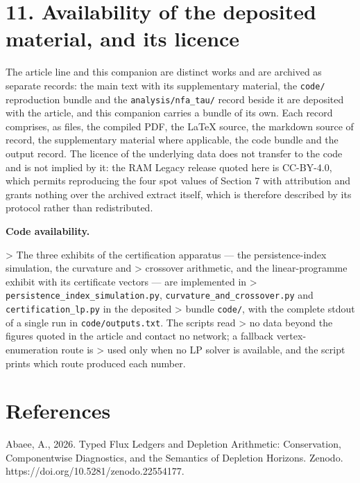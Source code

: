 \documentclass[11pt]{article}
\begin{document}
\vspace{0.8em}

\section*{11. Availability of the deposited material, and its licence}\label{11-availability-of-the-deposited-material-and-its-licence}

The article line and this companion are distinct works and are archived as separate records: the main text with its supplementary material, the \texttt{code/} reproduction bundle and the \texttt{analysis/nfa\_tau/} record beside it are deposited with the article, and this companion carries a bundle of its own. Each record comprises, as files, the compiled PDF, the LaTeX source, the markdown source of record, the supplementary material where applicable, the code bundle and the output record. The licence of the underlying data does not transfer to the code and is not implied by it: the RAM Legacy release quoted here is CC-BY-4.0, which permits reproducing the four spot values of Section 7 with attribution and grants nothing over the archived extract itself, which is therefore described by its protocol rather than redistributed.

\textbf{Code availability.}

> The three exhibits of the certification apparatus --- the persistence-index simulation, the curvature and > crossover arithmetic, and the linear-programme exhibit with its certificate vectors --- are implemented in > \texttt{persistence\_index\_simulation.py}, \texttt{curvature\_and\_crossover.py} and \texttt{certification\_lp.py} in the deposited > bundle \texttt{code/}, with the complete stdout of a single run in \texttt{code/outputs.txt}. The scripts read > no data beyond the figures quoted in the article and contact no network; a fallback vertex-enumeration route is > used only when no LP solver is available, and the script prints which route produced each number.

\vspace{0.8em}

\section*{References}\label{references}

Abaee, A., 2026. Typed Flux Ledgers and Depletion Arithmetic: Conservation, Componentwise Diagnostics, and the Semantics of Depletion Horizons. Zenodo. https://doi.org/10.5281/zenodo.22554177.
\end{document}
